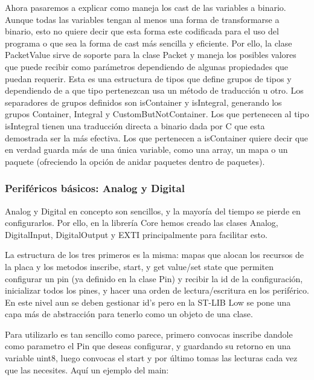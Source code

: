 \documentclass{report}
\begin{document}
Ahora pasaremos a explicar como maneja los cast de las variables a binario. Aunque todas las variables tengan al menos una forma de transformarse a binario, esto no quiere decir que esta forma este codificada para el uso del programa o que sea la forma de cast más sencilla y eficiente. Por ello, la clase PacketValue sirve de soporte para la clase Packet y maneja los posibles valores que puede recibir como parámetros dependiendo de algunas propiedades que puedan requerir. Esta es una estructura de tipos que define grupos de tipos y dependiendo de a que tipo pertenezcan usa un método de traducción u otro. Los separadores de grupos definidos son isContainer y isIntegral, generando los grupos Container, Integral y CustomButNotContainer. Los que pertenecen al tipo isIntegral tienen una traducción directa a binario dada por C que esta demostrada ser la más efectiva. Los que pertenecen a isContainer quiere decir que en verdad guarda más de una única variable, como una array, un mapa o un paquete (ofreciendo la opción de anidar paquetes dentro de paquetes). 
\par \vspace{0.3 cm}

\subsubsection{Periféricos básicos: Analog y Digital}
Analog y Digital en concepto son sencillos, y la mayoría del tiempo se pierde en configurarlos. Por ello, en la librería Core hemos creado las clases Analog, DigitalInput, DigitalOutput y EXTI principalmente para facilitar esto. \par
La estructura de los tres primeros es la misma: mapas que alocan los recursos de la placa y los metodos inscribe, start, y get value/set state que permiten configurar un pin (ya definido en la clase Pin) y recibir la id de la configuración, inicializar todos los pines, y hacer una orden de lectura/escritura en los periférico. En este nivel aun se deben gestionar id's pero en la ST-LIB Low se pone una capa más de abstracción para tenerlo como un objeto de una clase. 
\par \vspace{0.3 cm}
Para utilizarlo es tan sencillo como parece, primero convocas inscribe dandole como parametro el Pin que deseas configurar, y guardando su retorno en una variable uint8, luego convocas el start y por último tomas las lecturas cada vez que las necesites. Aquí un ejemplo del main:
\end{document}
